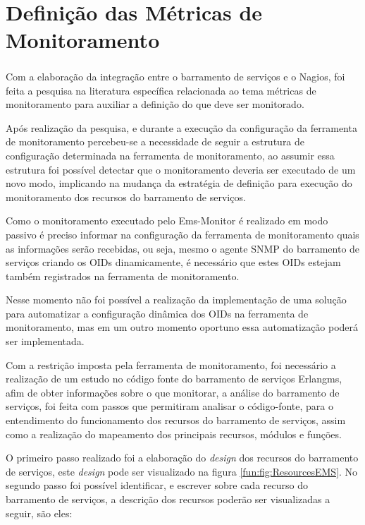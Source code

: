 
\section{Definição das Métricas de Monitoramento}
\label{metricas_monitoramento}

Com a elaboração da integração entre o barramento de serviços e o Nagios\textsuperscript{\textregistered}, foi feita a pesquisa na literatura específica relacionada ao tema métricas de monitoramento para auxiliar a definição do que deve ser monitorado. 

Após realização da pesquisa, e durante a execução da configuração da ferramenta de monitoramento percebeu-se a necessidade de seguir a estrutura de configuração determinada na ferramenta de monitoramento, ao assumir essa estrutura foi possível detectar que o monitoramento deveria ser executado de um novo modo, implicando na mudança da estratégia de definição para execução do monitoramento dos recursos do barramento de serviços. 

Como o monitoramento executado pelo Ems-Monitor é realizado em modo passivo é preciso informar na configuração da ferramenta de monitoramento quais as informações serão recebidas, ou seja, mesmo o agente \acrshort{SNMP} do barramento de serviços criando os \acrshort{OID}s dinamicamente, é necessário que estes \acrshort{OID}s estejam também registrados na ferramenta de monitoramento. 

Nesse momento  não foi possível a realização da implementação de uma solução para automatizar a configuração dinâmica dos \acrshort{OID}s na ferramenta de monitoramento, mas em um outro momento oportuno essa automatização poderá ser implementada.

Com a restrição imposta pela ferramenta de monitoramento, foi necessário a realização de um estudo no código fonte do barramento de serviços Erlangms, afim de obter informações sobre o que monitorar, a análise do barramento de serviços, foi feita com passos que permitiram analisar o código-fonte, para o entendimento do funcionamento dos recursos do barramento de serviços, assim como a realização do mapeamento dos principais recursos, módulos e funções. 

O primeiro passo realizado foi a elaboração do \textit{design} dos recursos do barramento de serviços, este \textit{design} pode ser visualizado na figura \ref{fun:fig:ResourcesEMS}. No segundo passo foi possível identificar, e escrever sobre cada recurso do barramento de serviços, a descrição dos recursos poderão ser visualizadas a seguir, são eles:

